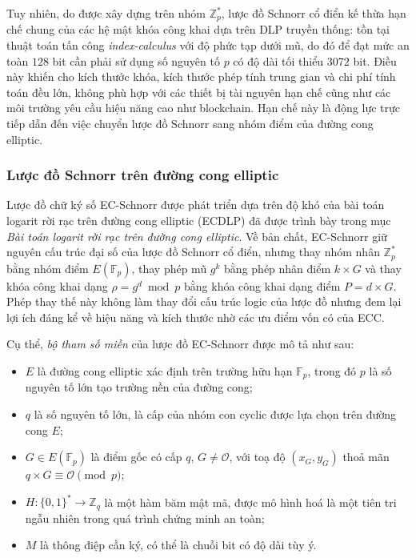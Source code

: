 Tuy nhiên, do được xây dựng trên nhóm $\mathbb{Z}_p^*$, lược đồ Schnorr cổ điển kế thừa hạn chế chung của các hệ mật khóa công khai dựa trên DLP truyền thống: tồn tại thuật toán tấn công \textit{index-calculus} với độ phức tạp dưới mũ, do đó để đạt mức an toàn $128$ bit cần phải sử dụng số nguyên tố $p$ có độ dài tối thiểu $3072$ bit. Điều này khiến cho kích thước khóa, kích thước phép tính trung gian và chi phí tính toán đều lớn, không phù hợp với các thiết bị tài nguyên hạn chế cũng như các môi trường yêu cầu hiệu năng cao như blockchain. Hạn chế này là động lực trực tiếp dẫn đến việc chuyển lược đồ Schnorr sang nhóm điểm của đường cong elliptic.

\subsubsection{Lược đồ Schnorr trên đường cong elliptic}

Lược đồ chữ ký số EC-Schnorr được phát triển dựa trên độ khó của bài toán logarit rời rạc trên đường cong elliptic (ECDLP) đã được trình bày trong mục \textit{Bài toán logarit rời rạc trên đường cong elliptic}. Về bản chất, EC-Schnorr giữ nguyên cấu trúc đại số của lược đồ Schnorr cổ điển, nhưng thay nhóm nhân $\mathbb{Z}_p^*$ bằng nhóm điểm $E(\mathbb{F}_p)$, thay phép mũ $g^k$ bằng phép nhân điểm $k \times G$ và thay khóa công khai dạng $\rho = g^d \bmod p$ bằng khóa công khai dạng điểm $P = d \times G$. Phép thay thế này không làm thay đổi cấu trúc logic của lược đồ nhưng đem lại lợi ích đáng kể về hiệu năng và kích thước nhờ các ưu điểm vốn có của ECC.

Cụ thể, \textit{bộ tham số miền} của lược đồ EC-Schnorr được mô tả như sau:

\begin{itemize}
    \item $E$ là đường cong elliptic xác định trên trường hữu hạn $\mathbb{F}_p$, trong đó $p$ là số nguyên tố lớn tạo trường nền của đường cong;
    \item $q$ là số nguyên tố lớn, là cấp của nhóm con cyclic được lựa chọn trên đường cong $E$;
    \item $G \in E(\mathbb{F}_p)$ là điểm gốc có cấp $q$, $G \neq \mathcal{O}$, với toạ độ $(x_G, y_G)$ thoả mãn $q \times G \equiv \mathcal{O} \pmod{p}$;
    \item $H: \{0,1\}^* \rightarrow \mathbb{Z}_q$ là một hàm băm mật mã, được mô hình hoá là một tiên tri ngẫu nhiên trong quá trình chứng minh an toàn;
    \item $M$ là thông điệp cần ký, có thể là chuỗi bit có độ dài tùy ý.
\end{itemize}

